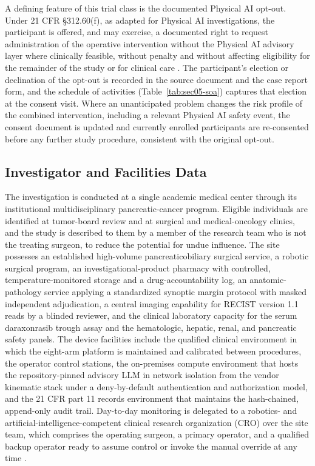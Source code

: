 A defining feature of this trial class is the documented Physical AI opt-out. Under
21 CFR \S 312.60(f), as adapted for Physical AI investigations, the participant is
offered, and may exercise, a documented right to request administration of the
operative intervention without the Physical AI advisory layer where clinically
feasible, without penalty and without affecting eligibility for the remainder of the
study or for clinical care \cite{cfr312paiuni}. The participant's election or
declination of the opt-out is recorded in the source document and the case report
form, and the schedule of activities (Table~\ref{tab:sec05-soa}) captures that
election at the consent visit. Where an unanticipated problem changes the risk
profile of the combined intervention, including a relevant Physical AI safety event,
the consent document is updated and currently enrolled participants are re-consented
before any further study procedure, consistent with the original opt-out.

\subsection{Investigator and Facilities Data}

The investigation is conducted at a single academic medical center through its
institutional multidisciplinary pancreatic-cancer program. Eligible individuals are
identified at tumor-board review and at surgical and medical-oncology clinics, and
the study is described to them by a member of the research team who is not the
treating surgeon, to reduce the potential for undue influence. The site possesses an
established high-volume pancreaticobiliary surgical service, a robotic surgical
program, an investigational-product pharmacy with controlled, temperature-monitored
storage and a drug-accountability log, an anatomic-pathology service applying a
standardized synoptic margin protocol with masked independent adjudication, a central
imaging capability for RECIST version 1.1 reads by a blinded reviewer, and the
clinical laboratory capacity for the serum daraxonrasib trough assay and the
hematologic, hepatic, renal, and pancreatic safety panels. The device facilities
include the qualified clinical environment in which the eight-arm platform is
maintained and calibrated between procedures, the operator control stations, the
on-premises compute environment that hosts the repository-pinned advisory LLM in
network isolation from the vendor kinematic stack under a deny-by-default
authentication and authorization model, and the 21 CFR part 11 records environment
that maintains the hash-chained, append-only audit trail. Day-to-day monitoring is
delegated to a robotics- and artificial-intelligence-competent clinical research
organization (CRO) over the site team, which comprises the operating surgeon, a
primary operator, and a qualified backup operator ready to assume control or invoke
the manual override at any time \cite{onpremwhippl,paisitedocpk}.

